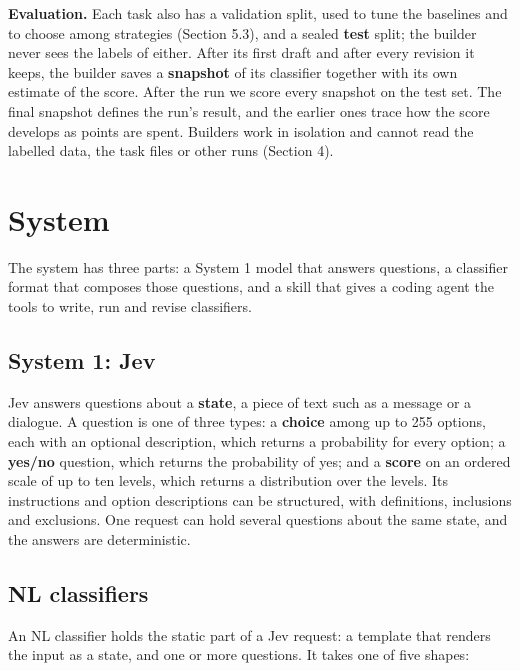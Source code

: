 \documentclass[11pt]{article}
\begin{document}
\textbf{Evaluation.} Each task also has a validation split, used to tune the baselines and to choose among strategies (Section 5.3), and a sealed \textbf{test} split; the builder never sees the labels of either. After its first draft and after every revision it keeps, the builder saves a \textbf{snapshot} of its classifier together with its own estimate of the score. After the run we score every snapshot on the test set. The final snapshot defines the run's result, and the earlier ones trace how the score develops as points are spent. Builders work in isolation and cannot read the labelled data, the task files or other runs (Section 4).

\section{System}

The system has three parts: a System 1 model that answers questions, a classifier format that composes those questions, and a skill that gives a coding agent the tools to write, run and revise classifiers.

\subsection{System 1: Jev}

Jev \citep{typesafe2026} answers questions about a \textbf{state}, a piece of text such as a message or a dialogue. A question is one of three types: a \textbf{choice} among up to 255 options, each with an optional description, which returns a probability for every option; a \textbf{yes/no} question, which returns the probability of yes; and a \textbf{score} on an ordered scale of up to ten levels, which returns a distribution over the levels. Its instructions and option descriptions can be structured, with definitions, inclusions and exclusions. One request can hold several questions about the same state, and the answers are deterministic.

\subsection{NL classifiers}

An NL classifier holds the static part of a Jev request: a template that renders the input as a state, and one or more questions. It takes one of five shapes:
\end{document}
